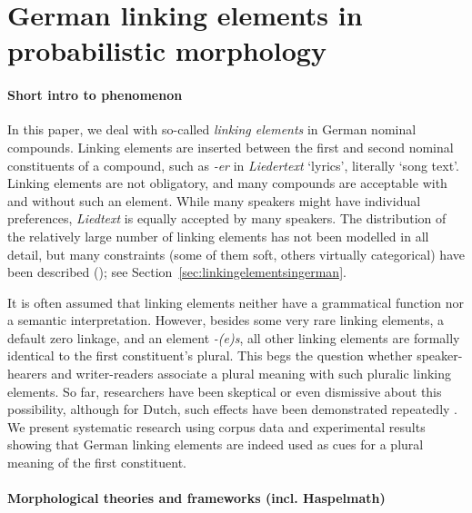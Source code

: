 \section{German linking elements in probabilistic morphology}
\label{sec:germanlinkingelementsinprobabilisticmorphology}

\paragraph{Short intro to phenomenon}

In this paper, we deal with so-called \textit{linking elements} in German nominal compounds.
Linking elements are inserted between the first and second nominal constituents of a compound, such as \textit{-er} in \textit{Liedertext} `lyrics', literally `song text'.
Linking elements are not obligatory, and many compounds are acceptable with and without such an element.
While many speakers might have individual preferences, \textit{Liedtext} is equally accepted by many speakers.
The distribution of the relatively large number of linking elements has not been modelled in all detail, but many constraints (some of them soft, others virtually categorical) have been described (\egg \citealt{Fuhrhop1996,Wegener2003,Schluecker2012,NueblingSzczepaniak2013,FuhrhopKuerschner2015}); see Section~\ref{sec:linkingelementsingerman}.

It is often assumed that linking elements neither have a grammatical function nor a semantic interpretation.
However, besides some very rare linking elements, a default zero linkage, and an element \textit{-(e)s}, all other linking elements are formally identical to the first constituent's plural.
This begs the question whether speaker-hearers and writer-readers associate a plural meaning with such pluralic linking elements.
So far, researchers have been skeptical or even dismissive about this possibility, although for Dutch, such effects have been demonstrated repeatedly \parencite{SchreuderEa1998,BangaEa2012,BangaEa2013a,BangaEa2013b}.
We present systematic research using corpus data and experimental results showing that German linking elements are indeed used as cues for a plural meaning of the first constituent.

\paragraph{Morphological theories and frameworks (incl. Haspelmath)}



